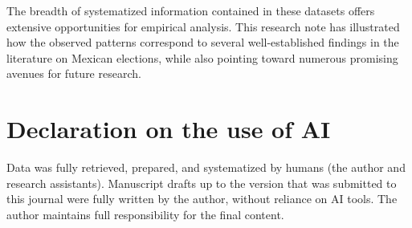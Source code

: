 \documentclass[letter,12pt]{article}
\begin{document}
The breadth of systematized information contained in these datasets offers extensive opportunities for empirical analysis. This research note has illustrated how the observed patterns correspond to several well-established findings in the literature on Mexican elections, while also pointing toward numerous promising avenues for future research.

\section{Declaration on the use of AI}

Data was fully retrieved, prepared, and systematized by humans (the author and research assistants). Manuscript drafts up to the version that was submitted to this journal were fully written by the author, without reliance on AI tools. The author maintains full responsibility for the final content.


\newpage
\end{document}
